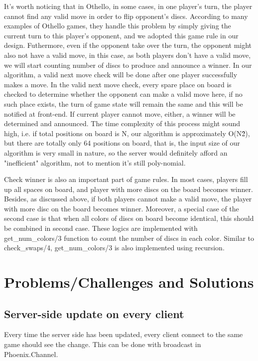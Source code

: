 It's worth noticing that in Othello, in some cases, in one player's turn, the player 
cannot find any valid move in order to flip opponent's discs. According to many 
examples of Othello games, they handle this problem by simply giving the current 
turn to this player's opponent, and we adopted this game rule in our design. 
Futhermore, even if the opponent take over the turn, the opponent might also not 
have a valid move, in this case, as both players don't have a valid move, we will 
start counting number of discs to produce and announce a winner. In our algorithm, 
a valid next move check will be done after one player successfully makes a move. 
In the valid next move check, every spare place on board is checked to determine 
whether the opponent can make a valid move here, if no such place exists, the turn 
of game state will remain the same and this will be notified at front-end. If current 
player cannot move, either, a winner will be determined and announced. The time 
complexity of this process might sound high, i.e. if total positions on board is N, 
our algorithm is approximately O(N\^2), but there are totally only 64 positions on 
board, that is, the input size of our algorithm is very small in nature, so the 
server would definitely afford an "inefficient" algorithm, not to mention it's still 
poly-nomial.

Check winner is also an important part of game rules. In most cases, players fill up 
all spaces on board, and player with more discs on the board becomes winner. Besides, 
as discussed above, if both players cannot make a valid move, the player with more 
disc on the board becomes winner. Moreover, a special case of the second case is that 
when all colors of discs on board become identical, this should be combined in second 
case. These logics are implemented with get\_num\_colors/3 function to count the number 
of discs in each color. Similar to check\_swaps/4, get\_num\_colors/3 is also implemented 
using recursion.


\section{Problems/Challenges and Solutions}
\subsection{Server-side update on every client} Every time the server side has
been updated, every client connect to the same game should see the change. This
can be done with broadcast in Phoenix.Channel.
